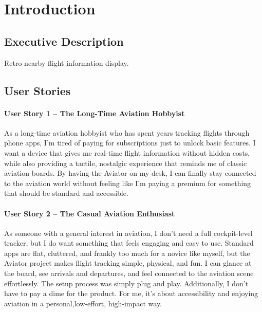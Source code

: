 \clearpage
\section{Introduction}
\subsection{Executive Description}

Retro nearby flight information display.

\subsection{User Stories}

\paragraph{User Story 1 – The Long-Time Aviation Hobbyist\newline} 
	As a long-time aviation hobbyist who has spent years tracking flights through phone apps, I’m tired of paying for subscriptions just to unlock basic features. 
    I want a device that gives me real-time flight information without hidden costs, while also providing a tactile, nostalgic experience that reminds me of classic aviation boards. 
    By having the Aviator on my desk, I can finally stay connected to the aviation world without feeling like I’m paying a premium for something that should be standard and accessible.   

\paragraph{User Story 2 – The Casual Aviation Enthusiast\newline} 
	As someone with a general interest in aviation, I don’t need a full cockpit-level tracker, but I do want something that feels engaging and easy to use. 
    Standard apps are flat, cluttered, and frankly too much for a novice like myself, but the Aviator project makes flight tracking simple, physical, and fun. 
    I can glance at the board, see arrivals and departures, and feel connected to the aviation scene effortlessly. The setup process was simply plug and play. 
    Additionally, I don’t have to pay a dime for the product. For me, it’s about accessibility and enjoying aviation in a personal,low-effort, high-impact way.


